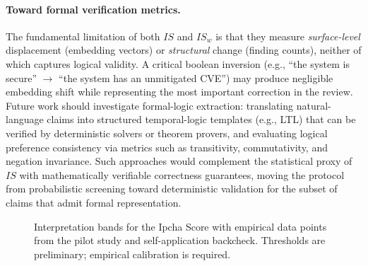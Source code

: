 \documentclass[11pt,a4paper]{article}
\begin{document}
\paragraph{Toward formal verification metrics.}
The fundamental limitation of both $\mathit{IS}$ and $\mathit{IS}_w$ is that they measure \emph{surface-level} displacement (embedding vectors) or \emph{structural} change (finding counts), neither of which captures logical validity.
A critical boolean inversion (e.g., ``the system is secure'' $\to$ ``the system has an unmitigated CVE'') may produce negligible embedding shift while representing the most important correction in the review.
Future work should investigate formal-logic extraction: translating natural-language claims into structured temporal-logic templates (e.g., LTL) that can be verified by deterministic solvers or theorem provers, and evaluating logical preference consistency via metrics such as transitivity, commutativity, and negation invariance.
Such approaches would complement the statistical proxy of $\mathit{IS}$ with mathematically verifiable correctness guarantees, moving the protocol from probabilistic screening toward deterministic validation for the subset of claims that admit formal representation.

\begin{figure}[t]
  \centering
  \caption{Interpretation bands for the Ipcha Score with empirical data points from the pilot study and self-application backcheck. Thresholds are preliminary; empirical calibration is required.}
  \label{fig:score}
\end{figure}
\end{document}
